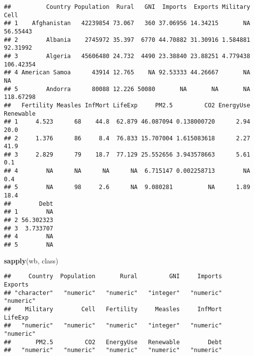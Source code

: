 \documentclass[
]{article}
\newenvironment{Shaded}{\begin{snugshade}}{\end{snugshade}}
\newcommand{\CommentTok}[1]{\textcolor[rgb]{0.56,0.35,0.01}{\textit{#1}}}
\newcommand{\DecValTok}[1]{\textcolor[rgb]{0.00,0.00,0.81}{#1}}
\newcommand{\FunctionTok}[1]{\textcolor[rgb]{0.13,0.29,0.53}{\textbf{#1}}}
\newcommand{\NormalTok}[1]{#1}
\newcommand{\OtherTok}[1]{\textcolor[rgb]{0.56,0.35,0.01}{#1}}
\newcommand{\SpecialCharTok}[1]{\textcolor[rgb]{0.81,0.36,0.00}{\textbf{#1}}}
\newcommand{\StringTok}[1]{\textcolor[rgb]{0.31,0.60,0.02}{#1}}
\begin{document}
\begin{verbatim}
##          Country Population  Rural   GNI  Imports  Exports Military      Cell
## 1    Afghanistan   42239854 73.067   360 37.06956 14.34215       NA  56.55443
## 2        Albania    2745972 35.397  6770 44.70882 31.30916 1.584881  92.31992
## 3        Algeria   45606480 24.732  4490 23.38840 23.88251 4.779438 106.42354
## 4 American Samoa      43914 12.765    NA 92.53333 44.26667       NA        NA
## 5        Andorra      80088 12.226 50080       NA       NA       NA 118.67298
##   Fertility Measles InfMort LifeExp     PM2.5         CO2 EnergyUse Renewable
## 1     4.523      68    44.8  62.879 46.087094 0.138000720      2.94      20.0
## 2     1.376      86     8.4  76.833 15.707004 1.615083618      2.27      41.9
## 3     2.829      79    18.7  77.129 25.552656 3.943578663      5.61       0.1
## 4        NA      NA      NA      NA  6.715147 0.002258713        NA       0.4
## 5        NA      98     2.6      NA  9.080281          NA      1.89      18.4
##        Debt
## 1        NA
## 2 56.302323
## 3  3.733707
## 4        NA
## 5        NA
\end{verbatim}

\begin{Shaded}
\begin{Highlighting}[]
\FunctionTok{sapply}\NormalTok{(wb, class)}
\end{Highlighting}
\end{Shaded}

\begin{verbatim}
##     Country  Population       Rural         GNI     Imports     Exports 
## "character"   "numeric"   "numeric"   "integer"   "numeric"   "numeric" 
##    Military        Cell   Fertility     Measles     InfMort     LifeExp 
##   "numeric"   "numeric"   "numeric"   "integer"   "numeric"   "numeric" 
##       PM2.5         CO2   EnergyUse   Renewable        Debt 
##   "numeric"   "numeric"   "numeric"   "numeric"   "numeric"
\end{verbatim}

\begin{Shaded}
\end{Shaded}
\end{document}
